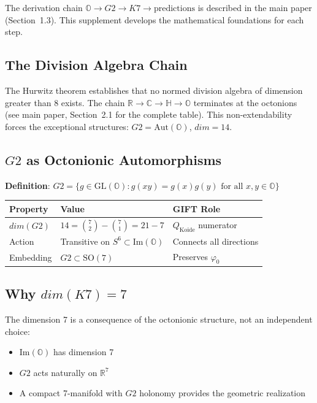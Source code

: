 \documentclass[11pt,a4paper]{article}
\newcommand{\Gtwo}{\mathrm{G}_2}
\newcommand{\Kseven}{K_7}
\newcommand{\dimE}{\mathrm{dim}}
\newcommand{\SO}{\mathrm{SO}}
\def\Gtwo{G2}%
\def\Kseven{K7}%
\def\dimE{dim}%
\begin{document}
The derivation chain $\mathbb{O} \to \Gtwo \to \Kseven \to \text{predictions}$ is described in the main paper (Section~1.3). This supplement develops the mathematical foundations for each step.

\subsection{The Division Algebra Chain}

The Hurwitz theorem establishes that no normed division algebra of dimension greater than 8 exists. The chain $\mathbb{R} \to \mathbb{C} \to \mathbb{H} \to \mathbb{O}$ terminates at the octonions (see main paper, Section~2.1 for the complete table). This non-extendability forces the exceptional structures: $\Gtwo = \mathrm{Aut}(\mathbb{O})$, $\dimE = 14$.

\subsection{$\Gtwo$ as Octonionic Automorphisms}

\textbf{Definition}: $\Gtwo = \{g \in \mathrm{GL}(\mathbb{O}) : g(xy) = g(x)g(y) \text{ for all } x,y \in \mathbb{O}\}$

\begin{table}[H]
\centering
\begin{tabular}{lll}
\toprule
Property & Value & GIFT Role \\
\midrule
$\dimE(\Gtwo)$ & $14 = \binom{7}{2} - \binom{7}{1} = 21 - 7$ & $Q_{\mathrm{Koide}}$ numerator \\
Action & Transitive on $S^6 \subset \mathrm{Im}(\mathbb{O})$ & Connects all directions \\
Embedding & $\Gtwo \subset \SO(7)$ & Preserves $\varphi_0$ \\
\bottomrule
\end{tabular}
\end{table}

\subsection{Why $\dimE(\Kseven) = 7$}

The dimension 7 is a consequence of the octonionic structure, not an independent choice:
\begin{itemize}
\item $\mathrm{Im}(\mathbb{O})$ has dimension 7
\item $\Gtwo$ acts naturally on $\mathbb{R}^7$
\item A compact 7-manifold with $\Gtwo$ holonomy provides the geometric realization
\end{itemize}
\end{document}
